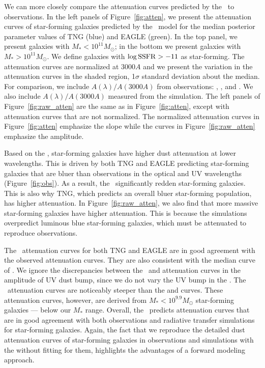 We can more closely compare the attenuation curves predicted by the \eda~to 
observations. In the left panels of Figure~\ref{fig:atten}, we present the 
attenuation curves of star-forming galaxies predicted by the \eda~model for 
the median posterior parameter values of TNG (blue) and EAGLE (green). In 
the top panel, we present galaxies with $M_* < 10^{11} M_\odot$; in 
the bottom we present galaxies with $M_* > 10^{11} M_\odot$. We define
galaxies with $\log {\rm SSFR} > -11$ as star-forming. The attenuation curves 
are normalized at
$3000A$ and we present the variation in the attenuation curves in the shaded
region, 1$\sigma$ standard deviation about the median. For comparison,
we include $A(\lambda)/A(3000A)$ from observations: \cite{calzetti2000},
\cite{battisti2017}, and \cite{salim2018}. We also include $A(\lambda)/A(3000A)$
measured from the \cite{narayanan2018} simulation. The left panels of
Figure~\ref{fig:raw_atten} are the same as in Figure~\ref{fig:atten}, except
with attenuation curves that are not normalized. The normalized attenuation
curves in Figure~\ref{fig:atten} emphasize the slope while the curves in
Figure~\ref{fig:raw_atten} emphasize the amplitude. 

Based on the \eda, star-forming galaxies have higher dust attenuation at lower
wavelengths. This is driven by both TNG and EAGLE predicting star-forming
galaxies that are bluer than observations in the optical and UV wavelengths
(Figure~\ref{fig:obs}). As a result, the \eda~significantly redden star-forming galaxies. This is also why TNG, which
predicts an overall bluer star-forming population, has higher attenuation. 
In Figure~\ref{fig:raw_atten}, we also find that more massive star-forming
galaxies have higher attenuation. This is because the simulations overpredict 
luminous blue star-forming galaxies, which must be attenuated to reproduce
observations. 

The \eda~attenuation curves for both TNG and EAGLE are in good agreement with the
observed \cite{salim2018} attenuation curves. They are also consistent with the
median curve of \cite{narayanan2018}. We ignore the discrepancies between the
\eda~and \cite{narayanan2018} attenuation curves in the amplitude of UV dust
bump, since we do not vary the UV bump in the \eda. The \eda~attenuation curves 
are noticeably steeper than the \cite{calzetti2000} and \cite{battisti2017} curves. 
These attenuation curves, however, are derived from $M_* < 10^{9.9}M_\odot$ 
star-forming galaxies --- below our $M_*$ range. %
Overall, the \eda~predicts attenuation curves that are in good agreement with 
both observations and radiative transfer simulations for star-forming galaxies. 
Again, the fact that we reproduce the detailed dust attenuation curves of star-forming 
galaxies in observations and simulations with the \eda without fitting for
them, highlights the advantages of a forward modeling approach. 

